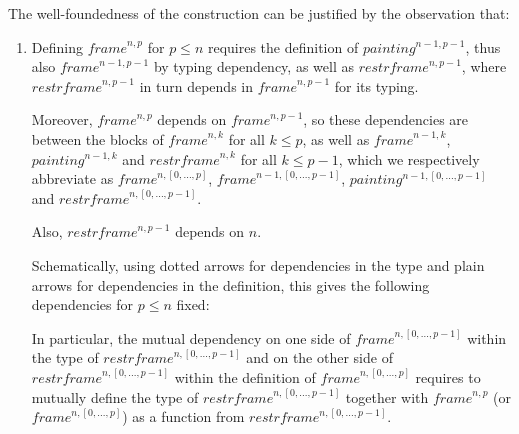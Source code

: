 \documentclass{article}
\newcommand{\myframe}{\mathit{frame}}
\newcommand{\painting}{\mathit{painting}}
\newcommand{\restrframe}{\mathit{restrframe}}
\begin{document}
The well-foundedness of the construction can be justified by the observation that:
\begin{enumerate}
  \item Defining $\myframe^{n,p}$ for $p \leq n$ requires the definition
        of $\painting^{n-1,p-1}$, thus also $\myframe^{n-1,p-1}$ by typing
        dependency, as well as $\restrframe^{n,p-1}$, where
        $\restrframe^{n,p-1}$ in turn depends in $\myframe^{n,p-1}$ for its
        typing.

        Moreover, $\myframe^{n,p}$ depends on $\myframe^{n,p-1}$, so these
        dependencies are between the blocks of $\myframe^{n,k}$ for all
        $k\leq p$, as well as $\myframe^{n-1,k}$, $\painting^{n-1,k}$ and
        $\restrframe^{n,k}$ for all $k\leq p-1$, which we respectively
        abbreviate as $\myframe^{n,[0,...,p]}$,
        $\myframe^{n-1,[0,...,p-1]}$, $\painting^{n-1,[0,...,p-1]}$ and
        $\restrframe^{n,[0,...,p-1]}$.

        Also, $\restrframe^{n,p-1}$ depends on $n$.

        Schematically, using dotted arrows for dependencies in
        the type and plain arrows for dependencies in the definition, this
        gives the following dependencies for $p\leq n$ fixed:
        \begin{center}
        \end{center}

        In particular, the mutual dependency on one side of
        $\myframe^{n,[0,...,p-1]}$ within the type of
        $\restrframe^{n,[0,...,p-1]}$ and on the other side of
        $\restrframe^{n,[0,...,p-1]}$ within the definition of
        $\myframe^{n,[0,...,p]}$ requires to mutually define the type of
        $\restrframe^{n,[0,...,p-1]}$ together with $\myframe^{n,p}$ (or
        $\myframe^{n,[0,...,p]}$) as a function from
        $\restrframe^{n,[0,...,p-1]}$.


\end{enumerate}
\end{document}
